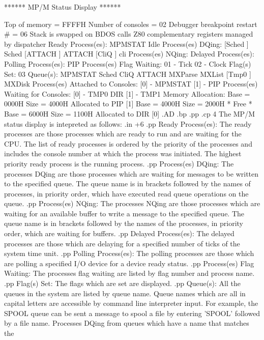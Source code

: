 	****** MP/M Status Display ******
	
	Top of memory = FFFFH
	Number of consoles = 02
	Debugger breakpoint restart # = 06
	Stack is swapped on BDOS calls
	Z80 complementary registers managed by dispatcher
	Ready Process(es):
	  MPMSTAT  Idle
	Process(es) DQing:
	 [Sched   ] Sched
	 [ATTACH  ] ATTACH
	 [CliQ    ] cli 
	Process(es) NQing:
	Delayed Process(es):
	Polling Process(es):
	  PIP
	Process(es) Flag Waiting:
	  01 -  Tick
	  02 -  Clock
	Flag(s) Set:
	  03
	Queue(s):
          MPMSTAT   Sched     CliQ      ATTACH    MXParse
          MXList   [Tmp0    ] MXDisk
	Process(es) Attached to Consoles:
	  [0] - MPMSTAT
	  [1] - PIP
	Process(es) Waiting for Consoles:
	  [0] - TMP0     DIR
	  [1] - TMP1
	Memory Allocation:
	  Base = 0000H  Size = 4000H  Allocated to PIP      [1]
	  Base = 4000H  Size = 2000H  * Free *
	  Base = 6000H  Size = 1100H  Allocated to DIR      [0]
.AD
.bp
.pp
.cp 4
The MP/M status display is intepreted as follows:
.in +6
.pp
Ready Process(es):  The ready processes are those processes which
are ready to run and are waiting for the CPU.  The list of ready
processes is ordered by the priority of the processes and includes
the console number at which the process was initiated.  The highest
priority ready process is the running process.
.pp
Process(es) DQing:  The processes DQing are those processes which are
waiting for messages to be written to the specified queue.  The queue
name is in brackets followed by the names of processes, in priority
order, which have executed read queue operations on the queue.
.pp
Process(es) NQing:  The processes NQing are those processes which are
waiting for an available buffer to write a message to the specified
queue.  The queue name is in brackets followed by the names of the
processes, in priority order, which are waiting for buffers.
.pp
Delayed Process(es):  The delayed processes are those which are
delaying for a specified number of ticks of the system time unit.
.pp
Polling Process(es):  The polling processes are those which
are polling a specified I/O device for a device ready status.
.pp
Process(es) Flag Waiting:  The processes flag waiting are listed by
flag number and process name.
.pp
Flag(s) Set:  The flags which are set are displayed.
.pp
Queue(s):  All the queues in the system are listed by queue name.
Queue names which are all in capital letters are accessible by
command line interpreter
input.  For example, the SPOOL queue can be sent a message to spool
a file by entering 'SPOOL' followed by a file name.
Processes DQing from queues which have a name that matches the

